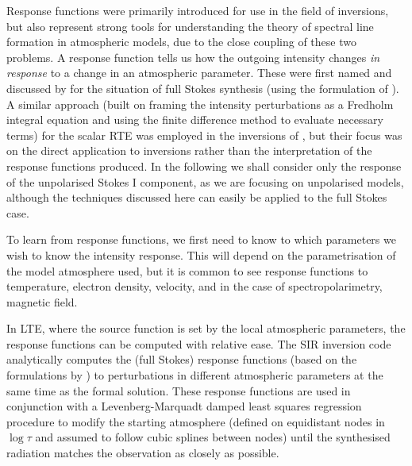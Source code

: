 Response functions were primarily introduced for use in the field of inversions, but also represent strong tools for understanding the theory of spectral line formation in atmospheric models, due to the close coupling of these two problems.
A response function tells us how the outgoing intensity changes \emph{in response} to a change in an atmospheric parameter.
These were first named and discussed by \citet{1992RuizCobo} for the situation of full Stokes synthesis (using the formulation of \citet{SanchezAlmeida1992}).
A similar approach (built on framing the intensity perturbations as a Fredholm integral equation and using the finite difference method to evaluate necessary terms) for the scalar RTE was employed in the inversions of \citet{Metcalf1990a}, but their focus was on the direct application to inversions rather than the interpretation of the response functions produced.
In the following we shall consider only the response of the unpolarised Stokes I component, as we are focusing on unpolarised models, although the techniques discussed here can easily be applied to the full Stokes case.

To learn from response functions, we first need to know to which parameters we wish to know the intensity response.
This will depend on the parametrisation of the model atmosphere used, but it is common to see response functions to temperature, electron density, velocity, and in the case of spectropolarimetry, magnetic field.

In LTE, where the source function is set by the local atmospheric parameters, the response functions can be computed with relative ease.
The SIR inversion code \citep{1992RuizCobo} analytically computes the (full Stokes) response functions (based on the formulations by \citet{SanchezAlmeida1992}) to perturbations in different atmospheric parameters at the same time as the formal solution.
These response functions are used in conjunction with a Levenberg-Marquadt damped least squares regression procedure to modify the starting atmosphere (defined on equidistant nodes in $\log \tau$ and assumed to follow cubic splines between nodes) until the synthesised radiation matches the observation as closely as possible.

